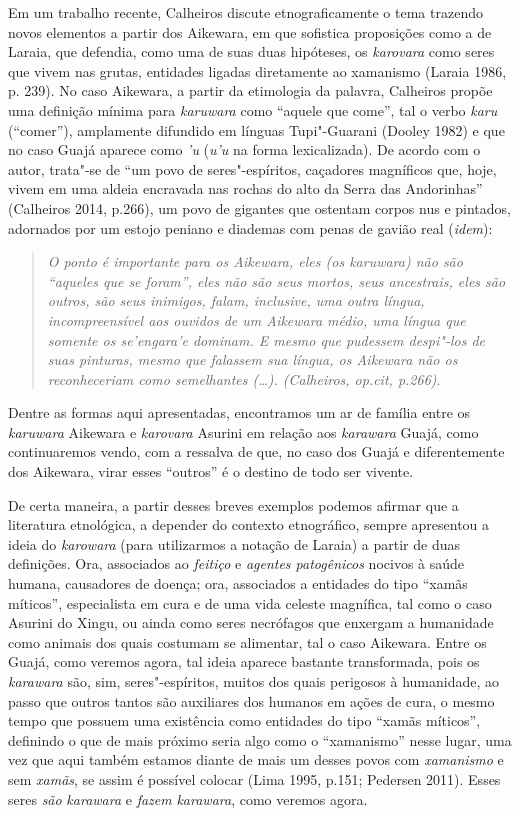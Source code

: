 Em um trabalho recente, Calheiros discute etnograficamente o tema
trazendo novos elementos a partir dos Aikewara, em que sofistica
proposições como a de Laraia, que defendia, como uma de suas duas
hipóteses, os \emph{karovara} como seres que vivem nas grutas, entidades
ligadas diretamente ao xamanismo (Laraia 1986, p. 239). No caso
Aikewara, a partir da etimologia da palavra, Calheiros propõe uma
definição mínima para \emph{karuwara} como ``aquele que come'', tal o
verbo \emph{karu} (``comer''), amplamente difundido em línguas
Tupi"-Guarani (Dooley 1982) e que no caso Guajá aparece como \emph{'u}
(\emph{u'u} na forma lexicalizada). De acordo com o autor, trata"-se de
``um povo de seres"-espíritos, caçadores magníficos que, hoje, vivem em
uma aldeia encravada nas rochas do alto da Serra das Andorinhas''
(Calheiros 2014, p.266), um povo de gigantes que ostentam corpos nus e
pintados, adornados por um estojo peniano e diademas com penas de gavião
real (\emph{idem}):

\begin{quote}
\emph{O ponto é importante para os Aikewara, eles (os \emph{karuwara}) não
são ``aqueles que se foram'', eles não são seus mortos, seus ancestrais,
eles são outros, são seus inimigos, falam, inclusive, uma outra língua,
incompreensível aos ouvidos de um Aikewara médio, uma língua que somente
os \emph{se'engara'e} dominam. E mesmo que pudessem despi"-los de suas
pinturas, mesmo que falassem sua língua, os Aikewara não os
reconheceriam como semelhantes (\ldots{}). (Calheiros, op.cit, p.266)}.
\end{quote}

Dentre as formas aqui apresentadas, encontramos um ar de família entre
os \emph{karuwara} Aikewara e \emph{karovara} Asurini em relação aos
\emph{karawara} Guajá, como continuaremos vendo, com a ressalva de que,
no caso dos Guajá e diferentemente dos Aikewara, virar esses ``outros''
é o destino de todo ser vivente.

De certa maneira, a partir desses breves exemplos podemos afirmar que a
literatura etnológica, a depender do contexto etnográfico, sempre
apresentou a ideia do \emph{karowara} (para utilizarmos a notação de
Laraia) a partir de duas definições. Ora, associados ao \emph{feitiço} e
\emph{agentes patogênicos} nocivos à saúde humana, causadores de doença;
ora, associados a entidades do tipo ``xamãs míticos'', especialista em
cura e de uma vida celeste magnífica, tal como o caso Asurini do Xingu,
ou ainda como seres necrófagos que enxergam a humanidade como animais
dos quais costumam se alimentar, tal o caso Aikewara. Entre os Guajá,
como veremos agora, tal ideia aparece bastante transformada, pois os
\emph{karawara} são, sim, seres"-espíritos, muitos dos quais perigosos à
humanidade, ao passo que outros tantos são auxiliares dos humanos em
ações de cura, o mesmo tempo que possuem uma existência como entidades
do tipo ``xamãs míticos'', definindo o que de mais próximo seria algo como
o ``xamanismo'' nesse lugar, uma vez que aqui também estamos diante de
mais um desses povos com \emph{xamanismo} e sem \emph{xamãs}, se assim é
possível colocar (Lima 1995, p.151; Pedersen 2011). Esses seres
\emph{são} \emph{karawara} e \emph{fazem} \emph{karawara}, como veremos
agora.

